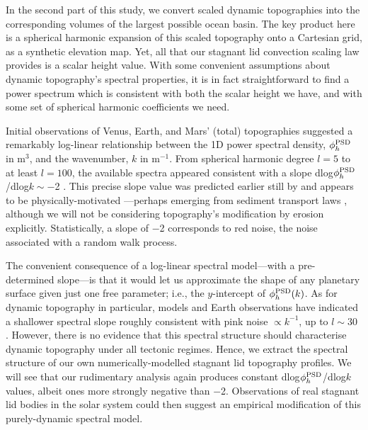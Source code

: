 \documentclass[trackchanges]{aastex63}
\begin{document}
In the second part of this study, we convert scaled dynamic topographies into the corresponding volumes of the largest possible ocean basin. The key product here is a spherical harmonic expansion of this scaled topography onto a Cartesian grid, as a synthetic elevation map. Yet, all that our stagnant lid convection scaling law provides is a scalar height value. With some convenient assumptions about dynamic topography's spectral properties, it is in fact straightforward to find a power spectrum which is consistent with both the scalar height we have, and with some set of spherical harmonic coefficients we need.

Initial observations of Venus, Earth, and Mars' (total) topographies suggested a remarkably log-linear relationship between the 1D power spectral density, $\phi^{\rm PSD}_h$ in m$^3$, and the wavenumber, $k$ in m$^{-1}$. From spherical harmonic degree $l=5$ to at least $l=100$, the available spectra appeared consistent with a slope dlog$\phi^{\rm PSD}_h$/dlog$k \sim-$2 \citep{turcotte_fractal_1987, rapp_decay_1989, balmino_spectra_1993}. This precise slope value was predicted earlier still by \citet{vening1951remarkable} and appears to be physically-motivated \citep{sayles_surface_1978, lovejoy_l12_1995}---perhaps emerging from sediment transport laws \citep{pelletier_why_1997, pelletier_self-organization_1999, roberts_generation_2019}, although we will not be considering topography's modification by erosion explicitly. Statistically, a slope of $-$2 corresponds to red noise, the noise associated with a random walk process. 



The convenient consequence of a log-linear spectral model---with a pre-determined slope---is that it would let us approximate the shape of any planetary surface given just one free parameter; i.e., the $y$-intercept of $\phi^{\rm PSD}_h(k)$. %
As for dynamic topography in particular, models and Earth observations have indicated a shallower spectral slope roughly consistent with pink noise $\propto k^{-1}$, up to $l\sim30$ \citep{hoggard_global_2016, hoggard_oceanic_2017, davies_earths_2019}. However, there is no evidence that this spectral structure should characterise dynamic topography under all tectonic regimes. Hence, we extract the spectral structure of our own numerically-modelled stagnant lid topography profiles. We will see that our rudimentary analysis again produces constant dlog$\phi^{\rm PSD}_h$/dlog$k$ values, albeit ones more strongly negative than $-$2. Observations of real stagnant lid bodies in the solar system could then suggest an empirical modification of this purely-dynamic spectral model. 
\end{document}
